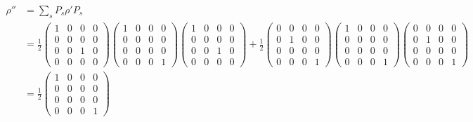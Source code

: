 \documentclass{article}%
\begin{document}
\begin{enumerate}
          \begin{align*}
              \rho'' & = \sum_{s}^{} P_s \rho' P_s  \\
                     & = \frac{1}{2}
              \begin{pmatrix}
                  1 & 0 & 0 & 0 \\
                  0 & 0 & 0 & 0 \\
                  0 & 0 & 1 & 0 \\
                  0 & 0 & 0 & 0
              \end{pmatrix}
              \begin{pmatrix}
                  1 & 0 & 0 & 0 \\
                  0 & 0 & 0 & 0 \\
                  0 & 0 & 0 & 0 \\
                  0 & 0 & 0 & 1
              \end{pmatrix}
              \begin{pmatrix}
                  1 & 0 & 0 & 0 \\
                  0 & 0 & 0 & 0 \\
                  0 & 0 & 1 & 0 \\
                  0 & 0 & 0 & 0
              \end{pmatrix}
              + \frac{1}{2}
              \begin{pmatrix}
                  0 & 0 & 0 & 0 \\
                  0 & 1 & 0 & 0 \\
                  0 & 0 & 0 & 0 \\
                  0 & 0 & 0 & 1
              \end{pmatrix}
              \begin{pmatrix}
                  1 & 0 & 0 & 0 \\
                  0 & 0 & 0 & 0 \\
                  0 & 0 & 0 & 0 \\
                  0 & 0 & 0 & 1
              \end{pmatrix}
              \begin{pmatrix}
                  0 & 0 & 0 & 0 \\
                  0 & 1 & 0 & 0 \\
                  0 & 0 & 0 & 0 \\
                  0 & 0 & 0 & 1
              \end{pmatrix}                        \\
                     & = \frac{1}{2} \begin{pmatrix}
                                         1 & 0 & 0 & 0 \\
                                         0 & 0 & 0 & 0 \\
                                         0 & 0 & 0 & 0 \\
                                         0 & 0 & 0 & 1
                                     \end{pmatrix}
          \end{align*}
\end{enumerate}
\end{document}
